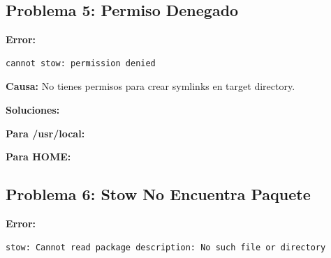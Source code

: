 \documentclass[
  doc,
  floatsintext,
  longtable,
  a4paper,
  nolmodern,
  notxfonts,
  notimes,
  12pt,
  colorlinks=true,linkcolor=blue,citecolor=blue,urlcolor=blue]{apa7}
\newenvironment{Shaded}{\begin{snugshade}}{\end{snugshade}}
\newcommand{\AttributeTok}[1]{\textcolor[rgb]{0.40,0.45,0.13}{#1}}
\newcommand{\CommentTok}[1]{\textcolor[rgb]{0.37,0.37,0.37}{#1}}
\newcommand{\FunctionTok}[1]{\textcolor[rgb]{0.28,0.35,0.67}{#1}}
\newcommand{\NormalTok}[1]{\textcolor[rgb]{0.00,0.23,0.31}{#1}}
\newcommand{\VariableTok}[1]{\textcolor[rgb]{0.07,0.07,0.07}{#1}}
\begin{document}
\subsection{Problema 5: Permiso
Denegado}\label{problema-5-permiso-denegado}

\textbf{Error:}

\begin{verbatim}
cannot stow: permission denied
\end{verbatim}

\textbf{Causa:} No tienes permisos para crear symlinks en target
directory.

\textbf{Soluciones:}

\textbf{Para /usr/local:}

\begin{Shaded}
\end{Shaded}

\textbf{Para HOME:}

\begin{Shaded}
\end{Shaded}

\subsection{Problema 6: Stow No Encuentra
Paquete}\label{problema-6-stow-no-encuentra-paquete}

\textbf{Error:}

\begin{verbatim}
stow: Cannot read package description: No such file or directory
\end{verbatim}
\end{document}
